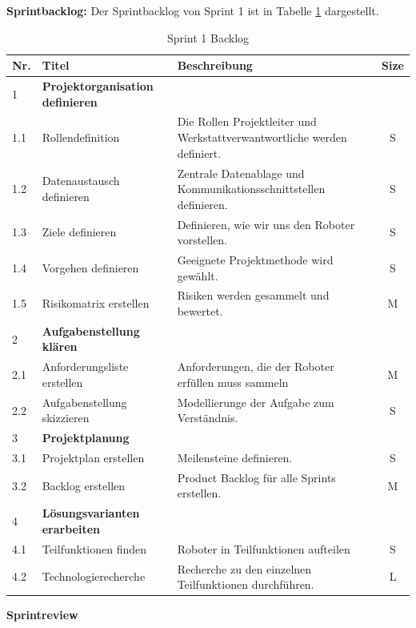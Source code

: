 \textbf{Sprintbacklog:} Der Sprintbacklog von Sprint 1 ist in Tabelle \ref{table:sprint1-backlog} dargestellt.

\begin{table}[H]
\centering
\small
\begin{tabularx}{\textwidth}{|l|l|X|c|}
\hline
  \textbf{Nr.} & \textbf{Titel} & \textbf{Beschreibung} & \textbf{Size}\\
  \hline
  1  & \textbf{Projektorganisation definieren} &  & \\
  \hline
  1.1  & Rollendefinition & Die Rollen Projektleiter und Werkstattverwantwortliche werden definiert. & S\\
  \hline
  1.2 & Datenaustausch definieren & Zentrale Datenablage und Kommunikationsschnittstellen definieren.& S\\
  \hline
  1.3 & Ziele definieren & Definieren, wie wir uns den Roboter vorstellen. & S\\
  \hline
  1.4 & Vorgehen definieren & Geeignete Projektmethode wird gewählt. & S\\
  \hline
  1.5 & Risikomatrix erstellen & Risiken werden gesammelt und bewertet. & M\\
  \hline
  2 & \textbf{Aufgabenstellung klären} &  & \\
  \hline
  2.1 & Anforderungsliste erstellen & Anforderungen, die der Roboter erfüllen muss sammeln & M \\
  \hline
  2.2 & Aufgabenstellung skizzieren & Modellierunge der Aufgabe zum Verständnis. & S \\
  \hline
  3 & \textbf{Projektplanung} &  & \\
  \hline
  3.1 & Projektplan erstellen & Meilensteine definieren. & S \\
  \hline
  3.2 & Backlog erstellen & Product Backlog für alle Sprints erstellen. & M \\
  \hline
  4 & \textbf{Lösungsvarianten erarbeiten} &  &  \\
  \hline
  4.1 & Teilfunktionen finden & Roboter in Teilfunktionen aufteilen & S \\
  \hline
  4.2 & Technologierecherche & Recherche zu den einzelnen Teilfunktionen durchführen. & L \\
  \hline
 
\end{tabularx}
\caption{Sprint 1 Backlog}
\label{table:sprint1-backlog}
\end{table}

\textbf{Sprintreview}


